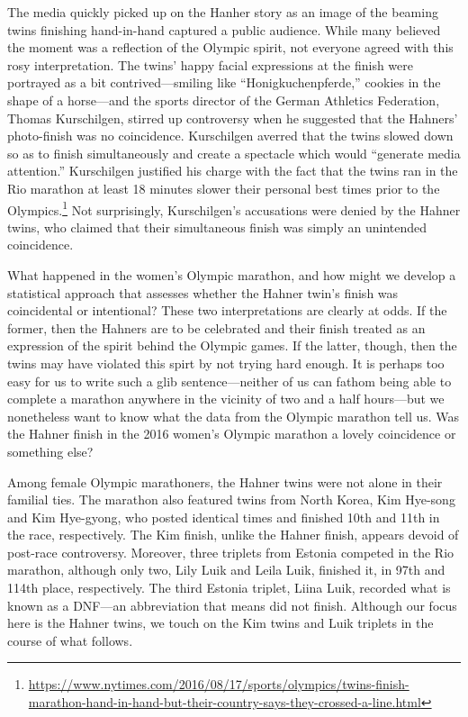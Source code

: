 \documentclass[12pt,titlepage]{article}
\begin{document}

The media quickly picked up on the Hanher story as an image of the
beaming twins finishing hand-in-hand captured a public audience. While
many believed the moment was a reflection of the Olympic spirit, not
everyone agreed with this rosy interpretation. The twins' happy facial
expressions at the finish were portrayed as a bit contrived---smiling
like ``Honigkuchenpferde,'' cookies in the shape of a horse---and the
sports director of the German Athletics Federation, Thomas
Kurschilgen, stirred up controversy when he suggested that the
Hahners' photo-finish was no coincidence.  Kurschilgen averred that
the twins slowed down so as to finish simultaneously and create a
spectacle which would ``generate media attention.''  Kurschilgen
justified his charge with the fact that the twins ran in the Rio
marathon at least 18 minutes slower their personal best times prior to
the
Olympics.\footnote{\url{https://www.nytimes.com/2016/08/17/sports/olympics/twins-finish-marathon-hand-in-hand-but-their-country-says-they-crossed-a-line.html}}
Not surprisingly, Kurschilgen's accusations were denied by the Hahner
twins, who claimed that their simultaneous finish was simply an
unintended coincidence.


What happened in the women's Olympic marathon, and how might we
develop a statistical approach that assesses whether the Hahner twin's
finish was coincidental or intentional?  These two interpretations are
clearly at odds. If the former, then the Hahners are to be celebrated
and their finish treated as an expression of the spirit behind the
Olympic games. If the latter, though, then the twins may have violated
this spirt by not trying hard enough. It is perhaps too easy for us to
write such a glib sentence---neither of us can fathom being able to
complete a marathon anywhere in the vicinity of two and a half
hours---but we nonetheless want to know what the data from the Olympic
marathon tell us.  Was the Hahner finish in the 2016 women's
Olympic marathon a lovely coincidence or something else?

Among female Olympic marathoners, the Hahner twins were not alone in
their familial ties.  The marathon also featured twins from North
Korea, Kim Hye-song and Kim Hye-gyong, who posted identical times and
finished 10th and 11th in the race, respectively. The Kim finish,
unlike the Hahner finish, appears devoid of post-race
controversy. Moreover, three triplets from Estonia competed in the Rio
marathon, although only two, Lily Luik and Leila Luik, finished it, in
97th and 114th place, respectively. The third Estonia triplet, Liina
Luik, recorded what is known as a DNF---an abbreviation that means did
not finish.  Although our focus here is the Hahner twins, we touch on
the Kim twins and Luik triplets in the course of what follows.
\end{document}
